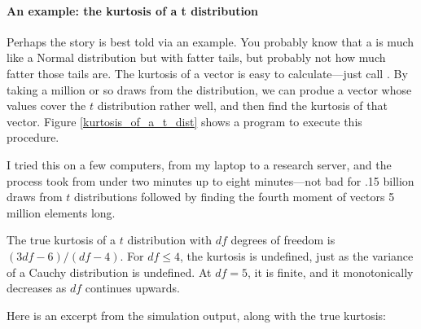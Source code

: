 \paragraph{An example: the kurtosis of a t distribution} Perhaps the
story is best told via an example.  You probably
know that a  is much like a Normal distribution but
with fatter tails, but probably not how much fatter those tails are.
The kurtosis of a vector is easy to calculate---just call
. By taking a million or so draws from the
distribution, we can produe a vector whose values cover the $t$
distribution rather well, and then find the kurtosis of that vector.
Figure \ref{kurtosis_of_a_t_dist} shows a program to execute this procedure. 

I tried this on a few computers, from my laptop to a research
server, and the process took from under two minutes up to eight
minutes---not bad for .15 billion draws from $t$ distributions followed
by finding the fourth moment of vectors 5 million elements
long.

The true kurtosis of a $t$ distribution with $df$ degrees of freedom
is $(3 df - 6)/(df - 4)$.  For $df\leq 4$, the kurtosis is undefined,
just as the variance of a Cauchy distribution is undefined. At $df = 5$,
it is finite, and it monotonically decreases as $df$ continues upwards.

Here is an excerpt from the simulation output, along with the true
kurtosis: 

